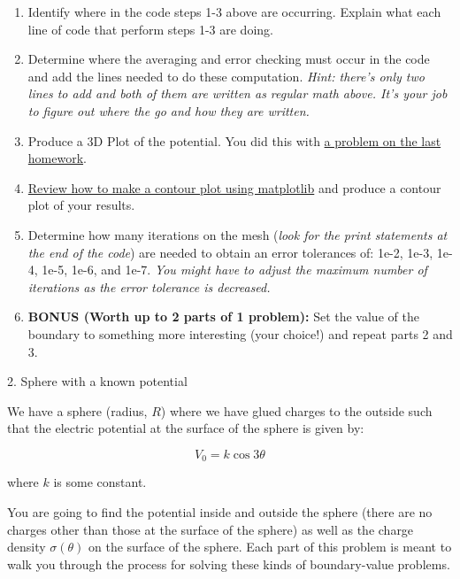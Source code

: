 \documentclass[11pt]{article}
\def\tightlist{}
\begin{document}
\begin{enumerate}
\def\labelenumi{\arabic{enumi}.}
\tightlist
\item
  Identify where in the code steps 1-3 above are occurring. Explain what
  each line of code that perform steps 1-3 are doing.
\item
  Determine where the averaging and error checking must occur in the
  code and add the lines needed to do these computation. \emph{Hint:
  there's only two lines to add and both of them are written as regular
  math above. It's your job to figure out where the go and how they are
  written.}
\item
  Produce a 3D Plot of the potential. You did this with
  \href{./homework6.html}{a problem on the last homework}.
\item
  \href{http://matplotlib.org/examples/pylab_examples/contour_demo.html}{Review
  how to make a contour plot using matplotlib} and produce a contour
  plot of your results.
\item
  Determine how many iterations on the mesh (\emph{look for the print
  statements at the end of the code}) are needed to obtain an error
  tolerances of: 1e-2, 1e-3, 1e-4, 1e-5, 1e-6, and 1e-7. \emph{You might
  have to adjust the maximum number of iterations as the error tolerance
  is decreased.}
\item
  \textbf{BONUS (Worth up to 2 parts of 1 problem):} Set the value of
  the boundary to something more interesting (your choice!) and repeat
  parts 2 and 3.
\end{enumerate}

{\Large 2. Sphere with a known
potential}\label{sphere-with-a-known-potential}

We have a sphere (radius, \(R\)) where we have glued charges to the
outside such that the electric potential at the surface of the sphere is
given by:

\[V_0 = k \cos 3\theta\]

where \(k\) is some constant.

You are going to find the potential inside and outside the sphere (there
are no charges other than those at the surface of the sphere) as well as
the charge density \(\sigma(\theta)\) on the surface of the sphere. Each
part of this problem is meant to walk you through the process for
solving these kinds of boundary-value problems.
\end{document}
